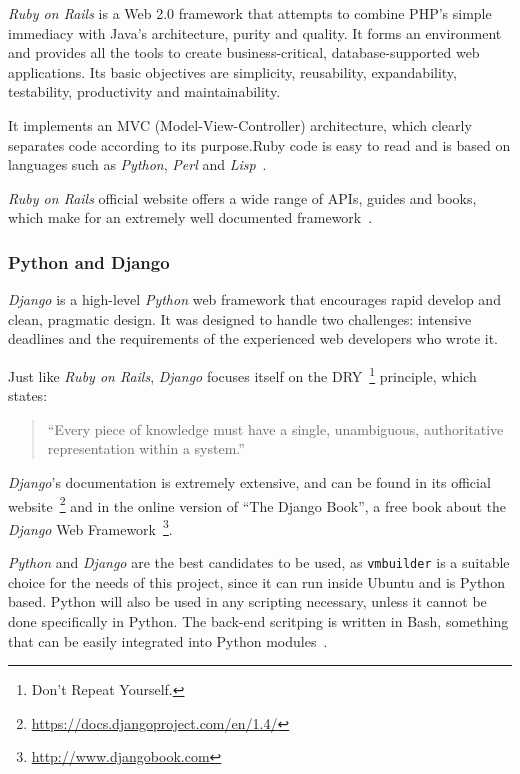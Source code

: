 \textit{Ruby on Rails} is a Web 2.0 framework that attempts to combine PHP’s simple immediacy with Java’s architecture, purity and quality. It forms an environment and provides all the tools to create business-critical, database-supported web applications. Its basic objectives are simplicity, reusability, expandability, testability, productivity and maintainability.

It implements an MVC (Model-View-Controller) architecture, which clearly separates code according to its purpose.Ruby code is easy to read and is based on languages such as \textit{Python}, \textit{Perl} and \textit{Lisp}~\cite{ror}.

\textit{Ruby on Rails} official website offers a wide range of APIs, guides and books, which make for an extremely well documented framework~\cite{rubyonrails}.

\subsubsection{Python and Django}\label{python}

\textit{Django} is a high-level \textit{Python} web framework that encourages rapid develop and clean, pragmatic design. It was designed to handle two challenges: intensive deadlines and the requirements of the experienced web developers who wrote it.

Just like \textit{Ruby on Rails}, \textit{Django} focuses itself on the DRY~\footnote{Don't Repeat Yourself.} principle, which states:
\begin{quote}
``Every piece of knowledge must have a single, unambiguous, authoritative representation within a system.''~\cite{c2}
\end{quote}
\textit{Django}’s documentation is extremely extensive, and can be found in its official website~\footnote{\url{https://docs.djangoproject.com/en/1.4/}} and in the online version of ``The Django Book'', a free book about the \textit{Django} Web Framework~\footnote{\url{http://www.djangobook.com}}.

\textit{Python} and \textit{Django} are the best candidates to be used, as \texttt{vmbuilder} is a suitable choice for the needs of this project, since it can run inside Ubuntu and is Python based. Python will also be used in any scripting necessary, unless it cannot be done specifically in
Python. The back-end scritping is written in Bash, something that can be easily integrated into Python modules~\cite{stackoverflow-python-bash}.

